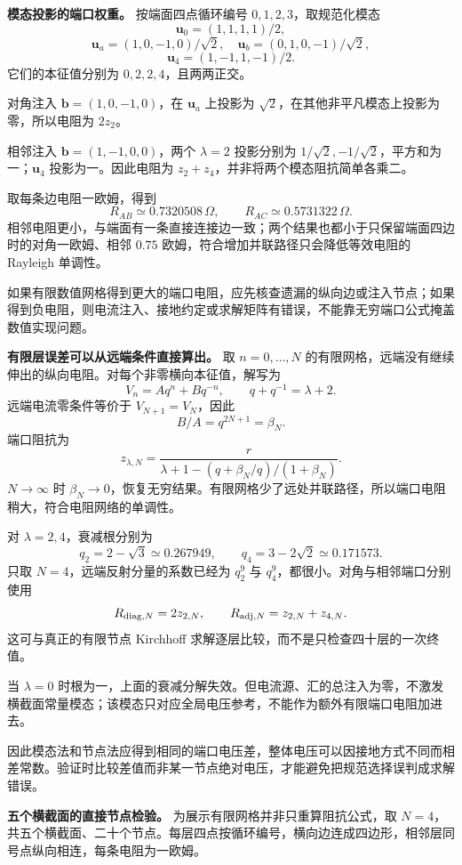 \documentclass[12pt,a4paper,UTF8]{ctexart}
\begin{document}
\textbf{模态投影的端口权重。} 按端面四点循环编号
\(0,1,2,3\)，取规范化模态 \[
\bm u_0=(1,1,1,1)/2,
\] \[
\bm u_a=(1,0,-1,0)/\sqrt2,\quad
\bm u_b=(0,1,0,-1)/\sqrt2,
\] \[
\bm u_4=(1,-1,1,-1)/2.
\] 它们的本征值分别为 \(0,2,2,4\)，且两两正交。

对角注入 \(\bm b=(1,0,-1,0)\)，在 \(\bm u_a\) 上投影为
\(\sqrt2\)，在其他非平凡模态上投影为零，所以电阻为 \(2z_2\)。

相邻注入 \(\bm b=(1,-1,0,0)\)，两个 \(\lambda=2\) 投影分别为
\(1/\sqrt2,-1/\sqrt2\)，平方和为一；\(\bm u_4\) 投影为一。因此电阻为
\(z_2+z_4\)，并非将两个模态阻抗简单各乘二。

取每条边电阻一欧姆，得到 \[
R_{AB}\simeq0.7320508\,\Omega,
\qquad R_{AC}\simeq0.5731322\,\Omega.
\]
相邻电阻更小，与端面有一条直接连接边一致；两个结果也都小于只保留端面四边时的对角一欧姆、相邻
\(0.75\) 欧姆，符合增加并联路径只会降低等效电阻的 Rayleigh 单调性。

如果有限数值网格得到更大的端口电阻，应先核查遗漏的纵向边或注入节点；如果得到负电阻，则电流注入、接地约定或求解矩阵有错误，不能靠无穷端口公式掩盖数值实现问题。

\textbf{有限层误差可以从远端条件直接算出。} 取 \(n=0,\ldots,N\)
的有限网格，远端没有继续伸出的纵向电阻。对每个非零横向本征值，解写为 \[
V_n=Aq^n+Bq^{-n},\qquad q+q^{-1}=\lambda+2.
\] 远端电流零条件等价于 \(V_{N+1}=V_N\)，因此 \[
B/A=q^{2N+1}=\beta_N.
\] 端口阻抗为 \[
z_{\lambda,N}=\frac{r}{\lambda+1-(q+\beta_N/q)/(1+\beta_N)}.
\] \(N\to\infty\) 时
\(\beta_N\to0\)，恢复无穷结果。有限网格少了远处并联路径，所以端口电阻稍大，符合电阻网络的单调性。

对 \(\lambda=2,4\)，衰减根分别为 \[
q_2=2-\sqrt3\simeq0.267949,
\qquad q_4=3-2\sqrt2\simeq0.171573.
\] 只取 \(N=4\)，远端反射分量的系数已经为 \(q_2^9\) 与
\(q_4^9\)，都很小。对角与相邻端口分别使用 \[
R_{{\rm diag},N}=2z_{2,N},
\qquad R_{{\rm adj},N}=z_{2,N}+z_{4,N}.
\] 这可与真正的有限节点 Kirchhoff
求解逐层比较，而不是只检查四十层的一次终值。

当 \(\lambda=0\)
时根为一，上面的衰减分解失效。但电流源、汇的总注入为零，不激发横截面常量模态；该模态只对应全局电压参考，不能作为额外有限端口电阻加进去。

因此模态法和节点法应得到相同的端口电压差，整体电压可以因接地方式不同而相差常数。验证时比较差值而非某一节点绝对电压，才能避免把规范选择误判成求解错误。

\textbf{五个横截面的直接节点检验。} 为展示有限网格并非只重算阻抗公式，取
\(N=4\)，共五个横截面、二十个节点。每层四点按循环编号，横向边连成四边形，相邻层同号点纵向相连，每条电阻为一欧姆。
\end{document}
